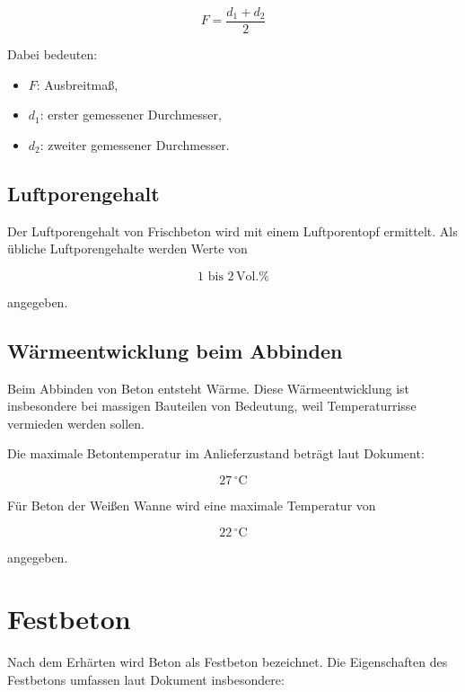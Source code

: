 \documentclass[
  12pt,
  a4paper,
  oneside
]{scrreprt}
\begin{document}
\begin{equation}
  F = \frac{d_1 + d_2}{2}
\end{equation}

Dabei bedeuten:

\begin{itemize}
  \item $F$: Ausbreitmaß,
  \item $d_1$: erster gemessener Durchmesser,
  \item $d_2$: zweiter gemessener Durchmesser.
\end{itemize}



\subsection{Luftporengehalt}

Der Luftporengehalt von Frischbeton wird mit einem Luftporentopf
ermittelt. Als übliche Luftporengehalte werden Werte von

\begin{equation}
  1 \text{ bis } 2\,\mathrm{Vol.\%}
\end{equation}

angegeben.


\subsection{Wärmeentwicklung beim Abbinden}

Beim Abbinden von Beton entsteht Wärme. Diese Wärmeentwicklung ist
insbesondere bei massigen Bauteilen von Bedeutung, weil
Temperaturrisse vermieden werden sollen.


Die maximale Betontemperatur im Anlieferzustand beträgt laut Dokument:

\begin{equation}
  27\,^\circ\mathrm{C}
\end{equation}

Für Beton der Weißen Wanne wird eine maximale Temperatur von

\begin{equation}
  22\,^\circ\mathrm{C}
\end{equation}

angegeben.


\section{Festbeton}

Nach dem Erhärten wird Beton als Festbeton bezeichnet. Die
Eigenschaften des Festbetons umfassen laut Dokument insbesondere:
\end{document}
